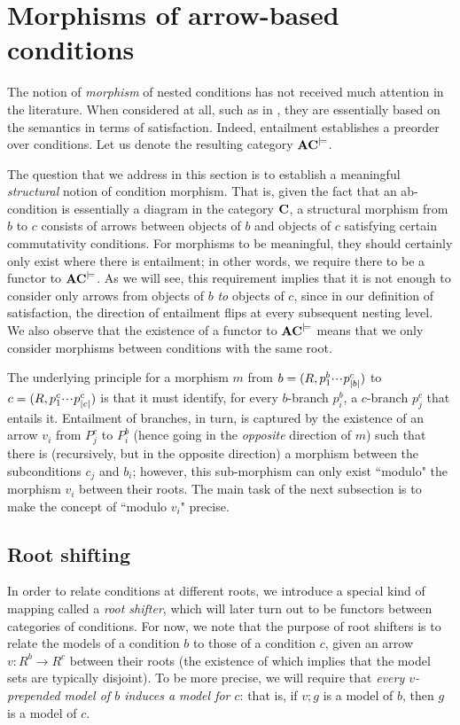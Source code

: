 \section{Morphisms of arrow-based conditions}

The notion of \emph{morphism} of nested conditions has not received much attention in the literature. When considered at all, such as in \cite{bchk:conditional-reactive-systems,sksclo:coinductive-techniques-for-satisfiability}, they are essentially based on the semantics in terms of satisfaction. Indeed, entailment establishes a preorder over conditions. Let us denote the resulting category $\mathbf{AC}^{\models}$.

The question that we address in this section is to establish a meaningful \emph{structural} notion of condition morphism. That is, given the fact that an ab-condition is essentially a diagram in the category $\mathbf{C}$, a structural morphism from $b$ to $c$ consists of arrows between objects of $b$ and objects of $c$ satisfying certain commutativity conditions. For morphisms to be meaningful, they should certainly only exist where there is entailment; in other words, we require there to be a functor to $\mathbf{AC}^{\models}$. As we will see, this requirement implies that it is not enough to consider only arrows from objects of $b$ \emph{to} objects of $c$, since in our definition of satisfaction, the direction of entailment flips at every subsequent nesting level. We also observe that the existence of a functor to $\mathbf{AC}^{\models}$ means that we only consider morphisms between conditions with the same root.

The underlying principle for a morphism $m$ from $b=(R,p^b_1{\cdotp\mkern-2mu\cdotp\mkern-2mu\cdotp\mkern1mu} p^c_{|b|})$ to $c=(R,p^c_1{\cdotp\mkern-2mu\cdotp\mkern-2mu\cdotp\mkern1mu} p^c_{|c|})$ is that it must identify, for every $b$-branch $p^b_i$, a $c$-branch $p^c_j$ that entails it. Entailment of branches, in turn, is captured by the existence of an arrow $v_i$ from $P^c_j$ to $P^b_i$ (hence going in the \emph{opposite} direction of $m$) such that there is (recursively, but in the opposite direction) a morphism between the subconditions $c_j$ and $b_i$; however, this sub-morphism can only exist ``modulo" the morphism $v_i$ between their roots. The main task of the next subsection is to make the concept of ``modulo $v_i$" precise.

\subsection{Root shifting}

In order to relate conditions at different roots, we introduce a special kind of mapping called a \emph{root shifter}, which will later turn out to be functors between categories of conditions. For now, we note that the purpose of root shifters is to relate the models of a condition $b$ to those of a condition $c$, given an arrow $v:R^b\to R^c$ between their roots (the existence of which implies that the model sets are typically disjoint). To be more precise, we will require that \emph{every $v$-prepended model of $b$ induces a model for $c$}: that is, if $v;g$ is a model of $b$, then $g$ is a model of $c$.

